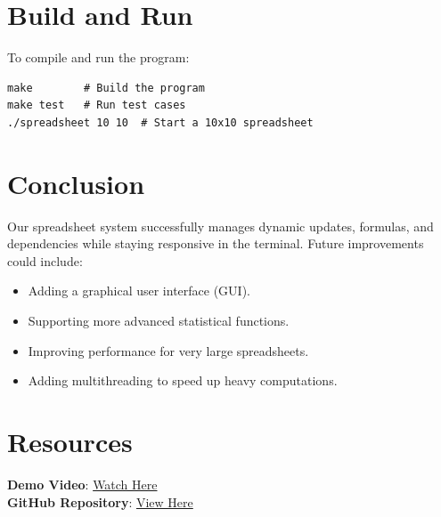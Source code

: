 \documentclass{article}
\begin{document}
\section{Build and Run}
To compile and run the program:
\begin{lstlisting}
make        # Build the program
make test   # Run test cases
./spreadsheet 10 10  # Start a 10x10 spreadsheet
\end{lstlisting}

\section{Conclusion}
Our spreadsheet system successfully manages dynamic updates, formulas, and dependencies while staying responsive in the terminal. Future improvements could include:
\begin{itemize}
    \item Adding a graphical user interface (GUI).
    \item Supporting more advanced statistical functions.
    \item Improving performance for very large spreadsheets.
    \item Adding multithreading to speed up heavy computations.
\end{itemize}

\section{Resources}
\textbf{Demo Video}: \href{https://example.com/demo}{Watch Here}\\
\textbf{GitHub Repository}: \href{https://github.com/example/repo}{View Here}
\end{document}
